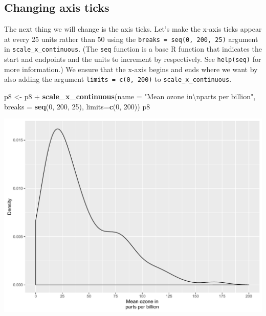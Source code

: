 \documentclass[]{article}
\newenvironment{Shaded}{\begin{snugshade}}{\end{snugshade}}
\newcommand{\KeywordTok}[1]{\textcolor[rgb]{0.13,0.29,0.53}{\textbf{{#1}}}}
\newcommand{\DataTypeTok}[1]{\textcolor[rgb]{0.13,0.29,0.53}{{#1}}}
\newcommand{\DecValTok}[1]{\textcolor[rgb]{0.00,0.00,0.81}{{#1}}}
\newcommand{\CharTok}[1]{\textcolor[rgb]{0.31,0.60,0.02}{{#1}}}
\newcommand{\StringTok}[1]{\textcolor[rgb]{0.31,0.60,0.02}{{#1}}}
\newcommand{\NormalTok}[1]{{#1}}
\begin{document}
\subsection{Changing axis ticks}\label{changing-axis-ticks-1}

The next thing we will change is the axis ticks. Let's make the x-axis
ticks appear at every 25 units rather than 50 using the
\texttt{breaks\ =\ seq(0,\ 200,\ 25)} argument in
\texttt{scale\_x\_continuous}. (The \texttt{seq} function is a base R
function that indicates the start and endpoints and the units to
increment by respectively. See \texttt{help(seq)} for more information.)
We ensure that the x-axis begins and ends where we want by also adding
the argument \texttt{limits\ =\ c(0,\ 200)} to
\texttt{scale\_x\_continuous}.

\begin{Shaded}
\begin{Highlighting}[]
\NormalTok{p8 <-}\StringTok{ }\NormalTok{p8 +}\StringTok{ }\KeywordTok{scale_x_continuous}\NormalTok{(}\DataTypeTok{name =} \StringTok{"Mean ozone in}\CharTok{\textbackslash{}n}\StringTok{parts per billion"}\NormalTok{,}
                              \DataTypeTok{breaks =} \KeywordTok{seq}\NormalTok{(}\DecValTok{0}\NormalTok{, }\DecValTok{200}\NormalTok{, }\DecValTok{25}\NormalTok{),}
                              \DataTypeTok{limits=}\KeywordTok{c}\NormalTok{(}\DecValTok{0}\NormalTok{, }\DecValTok{200}\NormalTok{))}
\NormalTok{p8}
\end{Highlighting}
\end{Shaded}

\begin{center}\includegraphics{0_all_posts_pdf/density_4-1} \end{center}
\end{document}
